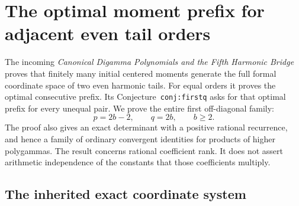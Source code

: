 \documentclass[11pt,a4paper]{article}
\numberwithin{equation}{section}
\theoremstyle{definition}
\theoremstyle{remark}
\begin{document}



\section{The optimal moment prefix for adjacent even tail orders}
\label{adj:section}

The incoming \emph{Canonical Digamma Polynomials and the Fifth Harmonic
Bridge} proves that finitely many initial centered moments generate the
full formal coordinate space of two even harmonic tails.  For equal
orders it proves the optimal consecutive prefix.  Its
Conjecture~\texttt{conj:firstq} asks for that optimal prefix for every
unequal pair.  We prove the entire first off-diagonal family:
\[
 p=2b-2,\qquad q=2b,\qquad b\ge2.
\]
The proof also gives an exact determinant with a positive rational
recurrence, and hence a family of ordinary convergent identities for
products of higher polygammas.  The result concerns rational coefficient
rank.  It does not assert arithmetic independence of the constants that
those coefficients multiply.

\subsection{The inherited exact coordinate system}
\end{document}
